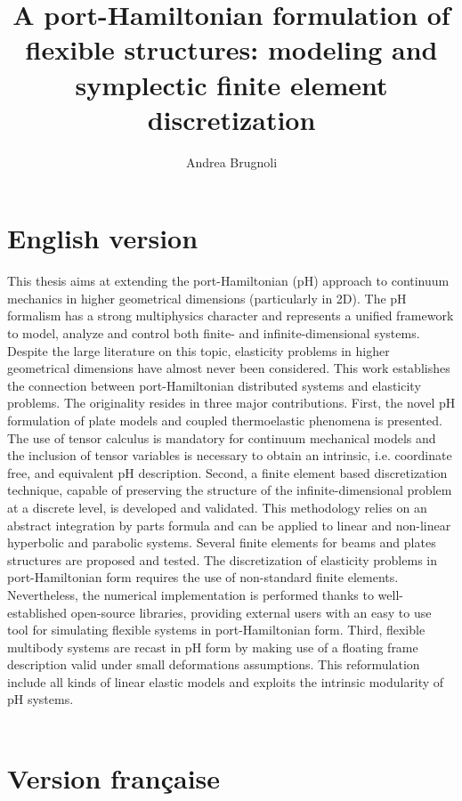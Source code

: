 \documentclass{article}
\title{A port-Hamiltonian formulation of flexible structures: modeling and symplectic finite element discretization}
\author{Andrea Brugnoli}
\begin{document}
\maketitle
\section*{English version}
This thesis aims at extending the port-Hamiltonian (pH) approach to continuum mechanics in higher geometrical dimensions (particularly in 2D). The pH formalism has a strong multiphysics character and represents a unified framework to model, analyze and control both finite- and infinite-dimensional systems. Despite the large literature on this topic, elasticity problems in higher geometrical dimensions have almost never been considered.  This work establishes the connection between port-Hamiltonian distributed systems and elasticity problems. The originality resides in three major contributions. First, the novel pH formulation of plate models and coupled thermoelastic phenomena is presented. The use of tensor calculus is mandatory for continuum mechanical models and the inclusion of tensor variables is necessary to obtain an intrinsic, i.e. coordinate free, and equivalent pH description. Second, a finite element based discretization technique, capable of preserving the structure of the infinite-dimensional problem at a discrete level, is developed and validated. This methodology relies on an abstract integration by parts formula and can be applied to linear and non-linear hyperbolic and parabolic systems. Several finite elements for beams and plates structures are proposed and tested. The discretization of elasticity problems in port-Hamiltonian form requires the use of non-standard finite elements. Nevertheless, the numerical implementation is performed thanks to well-established open-source libraries, providing external users with an easy to use tool for simulating flexible systems in port-Hamiltonian form. Third, flexible multibody systems are recast in pH form by making use of a floating frame description valid under small deformations assumptions. This reformulation include all kinds of linear elastic models and exploits the intrinsic modularity of pH systems. \\\\

\section*{Version française}
\end{document}
